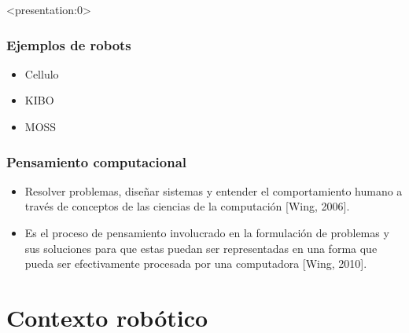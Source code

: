 \documentclass[spanish]{beamer}
\begin{document}
\begin{frame} <presentation:0> %
	\frametitle{Ejemplos de robots}
	\begin{itemize}
		\item Cellulo
		\item KIBO
		\item MOSS
	\end{itemize}
\end{frame}

\begin{frame}
	\frametitle{Pensamiento computacional}
	\begin{itemize}
		\item Resolver problemas, diseñar sistemas y entender el comportamiento humano a través de conceptos de las ciencias de la computación [Wing, 2006].
		
		\item Es el proceso de pensamiento involucrado en la formulación de problemas y sus soluciones para que estas puedan ser representadas en una forma que pueda ser efectivamente procesada por una computadora [Wing, 2010].
	\end{itemize}
\end{frame}


\section{Contexto robótico}
\end{document}
